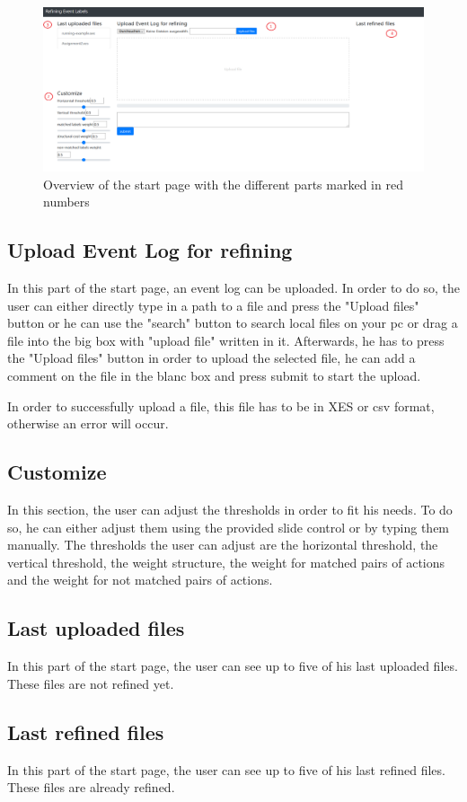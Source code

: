 \documentclass[notitlepage]{article}
\begin{document}
\begin{flushleft}
\begin{figure}[h]
\includegraphics[scale=0.42]{startpage.png}
\caption{Overview of the start page with the different parts marked in red numbers}
\end{figure}

\subsection{Upload Event Log for refining}
In this part of the start page, an event log can be uploaded. In order to do so, the user can either directly type in a path to a file and press the "Upload files" button or he can use the "search" button to search local files on your pc or drag a file into the big box with "upload file" written in it. Afterwards, he has to press the "Upload files" button in order to upload the selected file, he can add a comment on the file in the blanc box and press submit to start the upload. 

In order to successfully upload a file, this file has to be in XES or csv format, otherwise an error will occur. 

\subsection{Customize}
In this section, the user can adjust the thresholds in order to fit his needs. To do so, he can either adjust them using the provided slide control or by typing them manually. The thresholds the user can adjust are the horizontal threshold, the vertical threshold, the weight structure, the weight for matched pairs of actions and the weight for not matched pairs of actions.

\subsection{Last uploaded files}
In this part of the start page, the user can see up to five of his last uploaded files. These files are not refined yet.

\subsection{Last refined files}
In this part of the start page, the user can see up to five of his last refined files. These files are already refined.



\end{flushleft}
\end{document}
